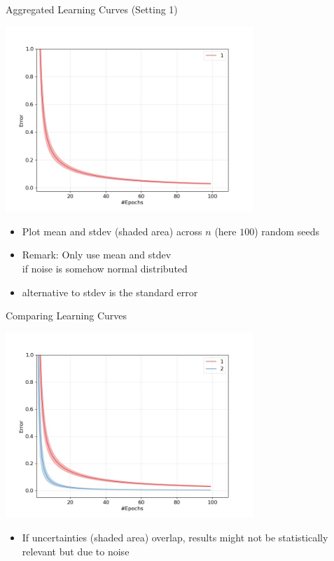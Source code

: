 \begin{frame}[c]{Aggregated Learning Curves (Setting 1)}

\centering
\includegraphics[width=0.7\textwidth]{scripts/hundred_agg_learning_curves.jpg}

\begin{itemize}
	\item Plot mean and stdev (shaded area) across $n$ (here $100$) random seeds\\
	\item Remark: Only use mean and stdev\\
	if noise is somehow normal distributed
	\item alternative to stdev is the standard error
\end{itemize}

\end{frame}
\begin{frame}[c]{Comparing Learning Curves}

\centering
\includegraphics[width=0.7\textwidth]{scripts/compare_learning_curves.jpg}

\begin{itemize}
	\item If uncertainties (shaded area) overlap, results might not be statistically relevant but due to noise
\end{itemize}

\end{frame}
